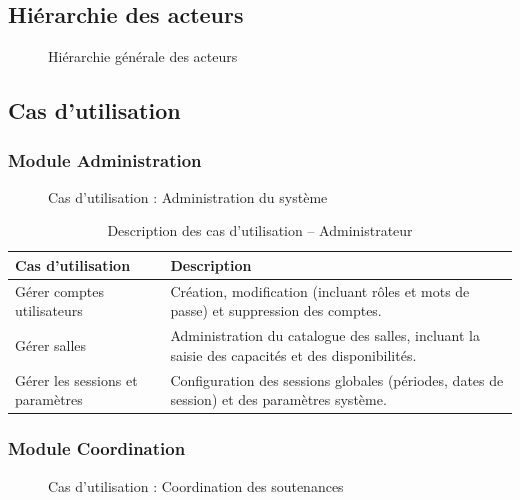 \documentclass[12pt,a4paper]{article}
\begin{document}
\subsection{Hiérarchie des acteurs}
\label{subsec:uml_acteurs}

\begin{figure}[H]
    \centering
    \caption{Hiérarchie générale des acteurs}
\end{figure}

\subsection{Cas d'utilisation}

\subsubsection{Module Administration}
\begin{figure}[H]
    \centering
    \caption{Cas d'utilisation : Administration du système}
\end{figure}

\begin{table}[H]
    \centering
    \small
    \begin{tabular}{lp{10cm}}
        \toprule
        \rowcolor{primary!10}
        \textbf{Cas d'utilisation}       & \textbf{Description}                                                                            \\
        \midrule
        Gérer comptes utilisateurs       & Création, modification (incluant rôles et mots de passe) et suppression des comptes.            \\
        \addlinespace
        Gérer salles                     & Administration du catalogue des salles, incluant la saisie des capacités et des disponibilités. \\
        \addlinespace
        Gérer les sessions et paramètres & Configuration des sessions globales (périodes, dates de session) et des paramètres système.     \\
        \bottomrule
    \end{tabular}
    \caption{Description des cas d'utilisation -- Administrateur}
\end{table}

\subsubsection{Module Coordination}
\begin{figure}[H]
    \centering
    \caption{Cas d'utilisation : Coordination des soutenances}
\end{figure}
\end{document}
